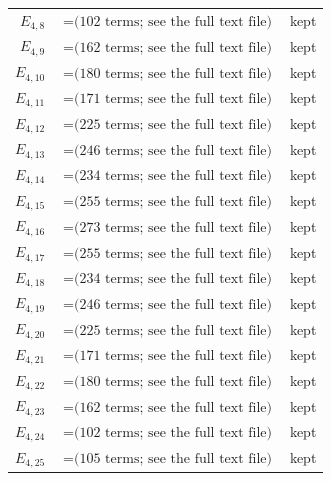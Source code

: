 \documentclass[10pt]{article}
\begin{document}
\begin{longtable}{r>{\raggedright\arraybackslash}p{}>{\raggedright\arraybackslash}p{}}
$E_{4,8}$ & $= \text{(102 terms; see the full text file)}$ & kept \\
$E_{4,9}$ & $= \text{(162 terms; see the full text file)}$ & kept \\
$E_{4,10}$ & $= \text{(180 terms; see the full text file)}$ & kept \\
$E_{4,11}$ & $= \text{(171 terms; see the full text file)}$ & kept \\
$E_{4,12}$ & $= \text{(225 terms; see the full text file)}$ & kept \\
$E_{4,13}$ & $= \text{(246 terms; see the full text file)}$ & kept \\
$E_{4,14}$ & $= \text{(234 terms; see the full text file)}$ & kept \\
$E_{4,15}$ & $= \text{(255 terms; see the full text file)}$ & kept \\
$E_{4,16}$ & $= \text{(273 terms; see the full text file)}$ & kept \\
$E_{4,17}$ & $= \text{(255 terms; see the full text file)}$ & kept \\
$E_{4,18}$ & $= \text{(234 terms; see the full text file)}$ & kept \\
$E_{4,19}$ & $= \text{(246 terms; see the full text file)}$ & kept \\
$E_{4,20}$ & $= \text{(225 terms; see the full text file)}$ & kept \\
$E_{4,21}$ & $= \text{(171 terms; see the full text file)}$ & kept \\
$E_{4,22}$ & $= \text{(180 terms; see the full text file)}$ & kept \\
$E_{4,23}$ & $= \text{(162 terms; see the full text file)}$ & kept \\
$E_{4,24}$ & $= \text{(102 terms; see the full text file)}$ & kept \\
$E_{4,25}$ & $= \text{(105 terms; see the full text file)}$ & kept \\

\end{longtable}
\end{document}
